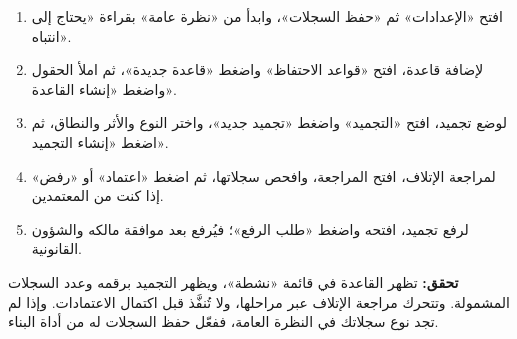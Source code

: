 \begin{enumerate}
\item افتح «الإعدادات» ثم «حفظ السجلات»، وابدأ من «نظرة عامة» بقراءة «يحتاج إلى انتباه».
\item لإضافة قاعدة، افتح «قواعد الاحتفاظ» واضغط «قاعدة جديدة»، ثم املأ الحقول واضغط «إنشاء القاعدة».
\item لوضع تجميد، افتح «التجميد» واضغط «تجميد جديد»، واختر النوع والأثر والنطاق، ثم اضغط «إنشاء التجميد».
\item لمراجعة الإتلاف، افتح المراجعة، وافحص سجلاتها، ثم اضغط «اعتماد» أو «رفض» إذا كنت من المعتمدين.
\item لرفع تجميد، افتحه واضغط «طلب الرفع»؛ فيُرفع بعد موافقة مالكه والشؤون القانونية.
\end{enumerate}

\textbf{تحقق:} تظهر القاعدة في قائمة «نشطة»، ويظهر التجميد برقمه وعدد السجلات المشمولة. وتتحرك مراجعة الإتلاف عبر مراحلها، ولا تُنفَّذ قبل اكتمال الاعتمادات. وإذا لم تجد نوع سجلاتك في النظرة العامة، ففعّل حفظ السجلات له من أداة البناء.
